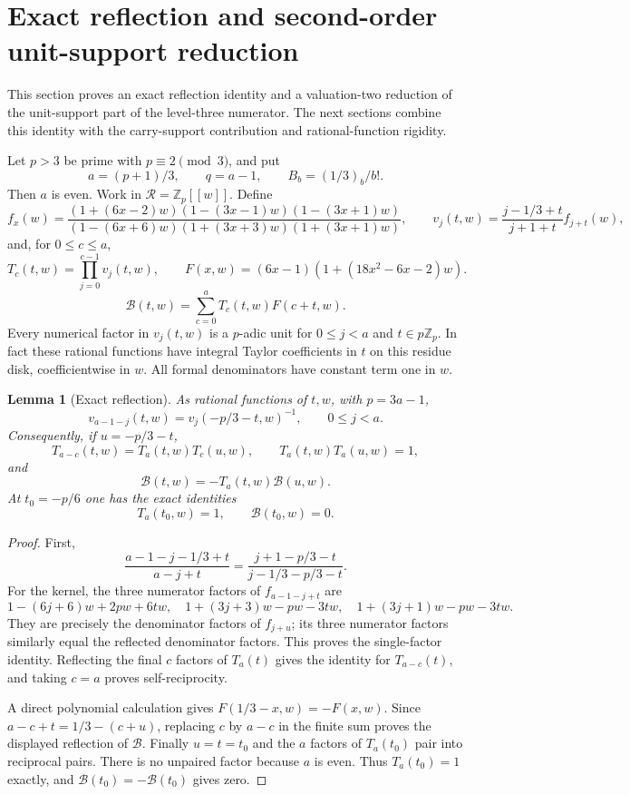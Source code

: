 \documentclass[11pt,letterpaper]{article}
\newtheorem{lemma}[theorem]{Lemma}
\numberwithin{equation}{section}
\begin{document}
\section{Exact reflection and second-order unit-support reduction}\label{loc-VIII-19}
\label{VIII-sec:E8-fine-reflection}
This section proves an exact reflection identity and a valuation-two
reduction of the unit-support part of the level-three numerator.
The next sections combine this identity with the carry-support
contribution and rational-function rigidity.

Let $p>3$ be prime with $p\equiv2\pmod3$, and put
\[
 a=(p+1)/3,\qquad q=a-1,\qquad B_b=(1/3)_b/b!.
\]
Then $a$ is even. Work in $\mathcal R=\mathbb Z_p[[w]]$. Define
\[
 f_x(w)=\frac{(1+(6x-2)w)(1-(3x-1)w)(1-(3x+1)w)}
 {(1-(6x+6)w)(1+(3x+3)w)(1+(3x+1)w)},
 \qquad
 v_j(t,w)=\frac{j-1/3+t}{j+1+t}f_{j+t}(w),
\]
and, for $0\le c\le a$,
\[
 T_c(t,w)=\prod_{j=0}^{c-1}v_j(t,w),\qquad
 F(x,w)=(6x-1)(1+(18x^2-6x-2)w).
\]
\[
 \mathcal B(t,w)=\sum_{c=0}^aT_c(t,w)F(c+t,w).
\]
Every numerical factor in $v_j(t,w)$ is a $p$-adic unit for
$0\le j<a$ and $t\in p\mathbb Z_p$. In fact these rational functions
have integral Taylor coefficients in $t$ on this residue disk,
coefficientwise in $w$. All formal denominators have constant term
one in $w$.

\begin{lemma}[Exact reflection]\label{VIII-E8:exact-reflection}
As rational functions of $t,w$, with $p=3a-1$,
\[
 v_{a-1-j}(t,w)=v_j(-p/3-t,w)^{-1},\qquad 0\le j<a.
\]
Consequently, if $u=-p/3-t$,
\[
 T_{a-c}(t,w)=T_a(t,w)T_c(u,w),\qquad
 T_a(t,w)T_a(u,w)=1,
\]
and
\[
 \boxed{\mathcal B(t,w)=-T_a(t,w)\mathcal B(u,w).}
\]
At $t_0=-p/6$ one has the exact identities
\[
 T_a(t_0,w)=1,\qquad \boxed{\mathcal B(t_0,w)=0}.
\]
\end{lemma}
\begin{proof}
First,
\[
 \frac{a-1-j-1/3+t}{a-j+t}
 =\frac{j+1-p/3-t}{j-1/3-p/3-t}.
\]
For the kernel, the three numerator factors of $f_{a-1-j+t}$ are
\[
 1-(6j+6)w+2pw+6tw,\quad
 1+(3j+3)w-pw-3tw,\quad
 1+(3j+1)w-pw-3tw.
\]
They are precisely the denominator factors of $f_{j+u}$; its three
numerator factors similarly equal the reflected denominator factors.
This proves the single-factor identity. Reflecting the final $c$
factors of $T_a(t)$ gives the identity for $T_{a-c}(t)$, and taking
$c=a$ proves self-reciprocity.

A direct polynomial calculation gives
$F(1/3-x,w)=-F(x,w)$. Since
$a-c+t=1/3-(c+u)$, replacing $c$ by $a-c$ in the finite sum proves
the displayed reflection of $\mathcal B$.
Finally $u=t=t_0$ and the $a$ factors of $T_a(t_0)$ pair into reciprocal
pairs. There is no unpaired factor because $a$ is even. Thus
$T_a(t_0)=1$ exactly, and $\mathcal B(t_0)=-\mathcal B(t_0)$ gives zero.
\end{proof}
\end{document}
